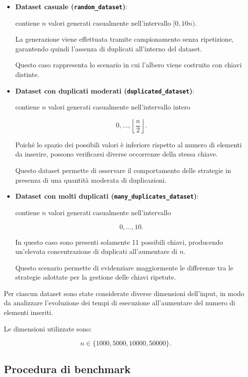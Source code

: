 \documentclass[a4paper,12pt]{article}
\begin{document}
\begin{itemize}

    \item \textbf{Dataset casuale (\texttt{random\_dataset})}:

    contiene $n$ valori generati casualmente nell'intervallo $[0,10n)$.

    La generazione viene effettuata tramite campionamento senza ripetizione, garantendo quindi l'assenza di duplicati all'interno del dataset.

    Questo caso rappresenta lo scenario in cui l'albero viene costruito con chiavi distinte.

    \item \textbf{Dataset con duplicati moderati (\texttt{duplicated\_dataset})}:

    contiene $n$ valori generati casualmente nell'intervallo intero

    \[
    0,\ldots,\left\lfloor\frac{n}{2}\right\rfloor.
    \]

    Poiché lo spazio dei possibili valori è inferiore rispetto al numero di elementi da inserire, possono verificarsi diverse occorrenze della stessa chiave.

    Questo dataset permette di osservare il comportamento delle strategie in presenza di una quantità moderata di duplicazioni.

    \item \textbf{Dataset con molti duplicati (\texttt{many\_duplicates\_dataset})}:

    contiene $n$ valori generati casualmente nell'intervallo

    \[
    0,\ldots,10.
    \]

    In questo caso sono presenti solamente 11 possibili chiavi, producendo un'elevata concentrazione di duplicati all'aumentare di $n$.

    Questo scenario permette di evidenziare maggiormente le differenze tra le strategie adottate per la gestione delle chiavi ripetute.

\end{itemize}

Per ciascun dataset sono state considerate diverse dimensioni dell'input, in modo da analizzare l'evoluzione dei tempi di esecuzione all'aumentare del numero di elementi inseriti.

Le dimensioni utilizzate sono:

\[
n \in \{1000,5000,10000,50000\}.
\]

\subsection{Procedura di benchmark}
\end{document}

